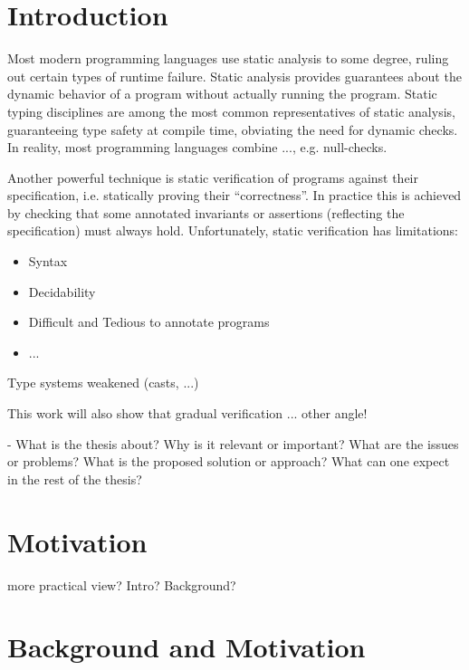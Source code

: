 
\chapter{Introduction}
Most modern programming languages use static analysis to some degree, ruling out certain types of runtime failure.
Static analysis provides guarantees about the dynamic behavior of a program without actually running the program.
Static typing disciplines are among the most common representatives of static analysis, guaranteeing type safety at compile time, obviating the need for dynamic checks.
In reality, most programming languages combine ..., e.g. null-checks.

Another powerful technique is static verification of programs against their specification, i.e. statically proving their “correctness”.
In practice this is achieved by checking that some annotated invariants or assertions (reflecting the specification) must always hold.
Unfortunately, static verification has limitations:
\begin{itemize} %
    \item Syntax
    \item Decidability
    \item Difficult and Tedious to annotate programs
    \item ...
\end{itemize}


Type systems weakened (casts, ...)



This work will also show that gradual verification ... other angle!

- 
What is the thesis about?
Why is it relevant or important?
What are the issues or problems?
What is the proposed solution or approach?
What can one expect in the rest of the thesis?


\chapter{Motivation}
more practical view? Intro? Background?


\chapter{Background and Motivation}

